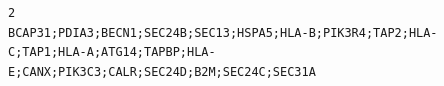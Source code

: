 \documentclass[
  letterpaper,
  DIV=11,
  numbers=noendperiod]{scrartcl}
\begin{document}
\begin{verbatim}
2                                                                                                                                                                                                                                                                                                                                                                                                                                                                                                                                                                                                                                                                                                                                                                                                                                                                                                                                                                                                                                                                                                                                                                                                                                                                                                                                                                                                                                                                                                                                                                                                                                                                                                                                                                                                                                                                                                                                                                                                                                                                                                                                                                                                                                                                                                                                                                                                                                                                                                                                                                                                                                                                                                                                                                                                                                                                                                           BCAP31;PDIA3;BECN1;SEC24B;SEC13;HSPA5;HLA-B;PIK3R4;TAP2;HLA-C;TAP1;HLA-A;ATG14;TAPBP;HLA-E;CANX;PIK3C3;CALR;SEC24D;B2M;SEC24C;SEC31A

\end{verbatim}
\end{document}

